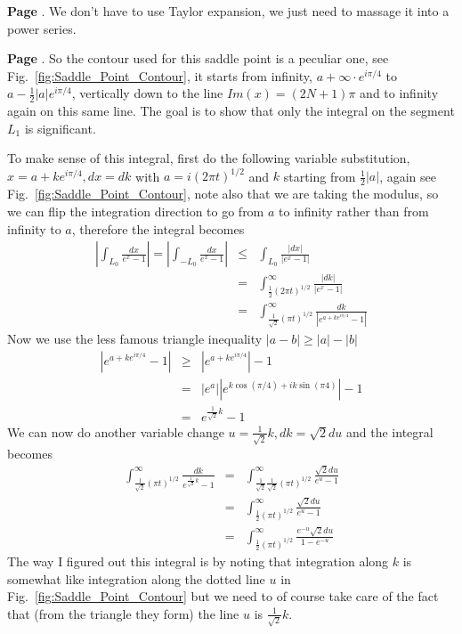 \documentclass[aps,preprint,preprintnumbers,nofootinbib,showpacs,prd]{revtex4-1}
\newcommand{\nbea}{\begin{eqnarray*}}
\newcommand{\neea}{\end{eqnarray*}}
\begin{document}
{\bf Page }. We don't have to use Taylor expansion, we just need to massage it into a power series.













{\bf Page }. So the contour used for this saddle point is a peculiar one, see Fig.~\ref{fig:Saddle_Point_Contour}, it starts from infinity, $a + \infty\cdot e^{i\pi/4}$ to $a - \frac{1}{2}|a|e^{i\pi/4}$, vertically down to the line $Im(x) = (2N+1)\pi$ and to infinity again on this same line. The goal is to show that only the integral on the segment $L_1$ is significant.

To make sense of this integral, first do the following variable substitution, $x = a + k e^{i\pi/4}, dx = dk$ with $a = i(2\pi t)^{1/2}$ and $k$ starting from $\frac{1}{2} |a|$, again see Fig.~\ref{fig:Saddle_Point_Contour}, note also that we are taking the modulus, so we can flip the integration direction to go from $a$ to infinity rather than from infinity to $a$, therefore the integral becomes
%
\nbea
\left | \int_{L_0} \frac{dx}{e^x - 1} \right | = \left | \int_{-L_0} \frac{dx}{e^x - 1} \right | & \le & \int_{L_0} \frac{|dx|}{|e^x - 1|} \\
& = & \int_{\frac{1}{2}(2\pi t)^{1/2}}^\infty \frac{|dk|}{|e^x - 1|} \\
& = & \int_{\frac{1}{\sqrt{2}}(\pi t)^{1/2}}^\infty \frac{dk}{|e^{a + k e^{i\pi/4}} - 1|}
\neea
%
Now we use the less famous triangle inequality $|a- b| \ge |a| - |b|$
%
\nbea
|e^{a + k e^{i\pi/4}} - 1| & \ge & |e^{a + k e^{i\pi/4}}| - 1 \\
& = & |e^{a}||e^{k \cos (\pi/4) + i k \sin(\pi 4)}| - 1 \\
& = & e^{\frac{1}{\sqrt{2}}k } - 1
\neea
%
We can now do another variable change $u = \frac{1}{\sqrt{2}} k, dk = \sqrt{2} du$ and the integral becomes
%
\nbea
\int_{\frac{1}{\sqrt{2}}(\pi t)^{1/2}}^\infty \frac{dk}{e^{\frac{1}{\sqrt{2}}k } - 1} & = & \int_{\frac{1}{\sqrt{2}}\frac{1}{\sqrt{2}}(\pi t)^{1/2}}^\infty \frac{\sqrt{2} du}{e^{u} - 1} \\
& = & \int_{\frac{1}{2}(\pi t)^{1/2}}^\infty \frac{\sqrt{2} du}{e^{u} - 1} \\
& = & \int_{\frac{1}{2}(\pi t)^{1/2}}^\infty \frac{e^{-u}\sqrt{2} du}{1 - e^{-u}}
\neea
%
The way I figured out this integral is by noting that integration along $k$ is somewhat like integration along the dotted line $u$ in Fig.~\ref{fig:Saddle_Point_Contour} but we need to of course take care of the fact that (from the triangle they form) the line $u$ is $\frac{1}{\sqrt{2}} k$.
\end{document}
